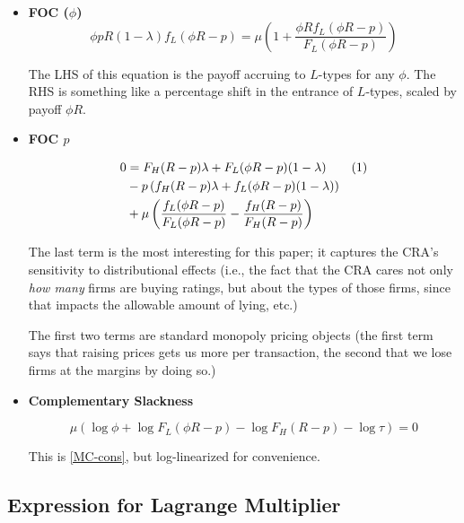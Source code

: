 \documentclass{article}
\newcommand\numberthis{\addtocounter{equation}{1}\tag{\theequation}}
\theoremstyle{definition}
\begin{document}
\begin{itemize}
    \item \textbf{FOC ($\phi$)}
    \begin{equation}
        \label{FOC-phi}
        \phi p R (1 - \lambda)f_L(\phi R - p) = \mu \left(1 + \frac{\phi R f_L(\phi R - p)}{F_L(\phi R - p)}\right)
    \end{equation}

    The LHS of this equation is the payoff accruing to $L$-types for any $\phi$. The RHS is something like a percentage shift in the entrance of $L$-types, scaled by payoff $\phi R$. 

    \item \textbf{FOC $p$}
    
    \begin{align*}
        0 &= F_H (R - p)\lambda + F_L(\phi R - p)(1 - \lambda) \numberthis \label{FOC-p}  \\ 
        &- p\left(f_H(R - p)\lambda + f_L(\phi R - p)(1 - \lambda) \right) \\ 
        &+ \mu \left(\frac{f_L (\phi R - p)}{F_L (\phi R - p)} - \frac{f_H(R - p)}{F_H(R - p)}\right)
    \end{align*}

    The last term is the most interesting for this paper; it captures the CRA's sensitivity to distributional effects (i.e., the fact that the CRA cares not only \emph{how many} firms are buying ratings, but about the types of those firms, since that impacts the allowable amount of lying, etc.)

    The first two terms are standard monopoly pricing objects (the first term says that raising prices gets us more per transaction, the second that we lose firms at the margins by doing so.)

    \item \textbf{Complementary Slackness}
    
    \begin{equation}
        \label{slackness}
        \mu(\log \phi + \log F_L(\phi R - p) - \log F_H(R - p) - \log \tau) = 0
    \end{equation}

    This is \eqref{MC-cons}, but log-linearized for convenience.
\end{itemize}

\subsection{Expression for Lagrange Multiplier}
\end{document}
